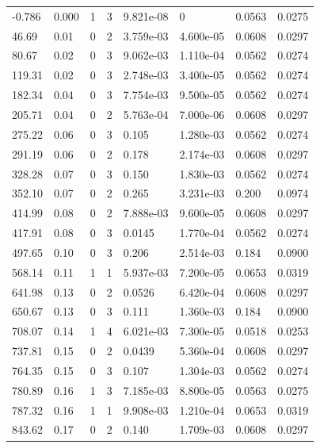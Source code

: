 \documentclass[preview]{standalone}
\begin{document}
{{\begin{tabular}{L{1.2cm}C{1.2cm} C{0.3cm}C{0.5cm} C{1.4cm}C{1.4cm} C{1.4cm}C{1.4cm}}
  -0.786  &  0.000  & 1     &  3 &  9.821e-08  & 0  & 0.0563 &  0.0275   \\ 
  46.69  &  0.01  & 0     &  2 &  3.759e-03  & 4.600e-05  & 0.0608 &  0.0297   \\ 
  80.67  &  0.02  & 0     &  3 &  9.062e-03  & 1.110e-04  & 0.0562 &  0.0274   \\ 
  119.31  &  0.02  & 0     &  3 &  2.748e-03  & 3.400e-05  & 0.0562 &  0.0274   \\ 
  182.34  &  0.04  & 0     &  3 &  7.754e-03  & 9.500e-05  & 0.0562 &  0.0274   \\ 
  205.71  &  0.04  & 0     &  2 &  5.763e-04  & 7.000e-06  & 0.0608 &  0.0297   \\ 
  275.22  &  0.06  & 0     &  3 &  0.105  & 1.280e-03  & 0.0562 &  0.0274   \\ 
  291.19  &  0.06  & 0     &  2 &  0.178  & 2.174e-03  & 0.0608 &  0.0297   \\ 
  328.28  &  0.07  & 0     &  3 &  0.150  & 1.830e-03  & 0.0562 &  0.0274   \\ 
  352.10  &  0.07  & 0     &  2 &  0.265  & 3.231e-03  & 0.200 &  0.0974   \\ 
  414.99  &  0.08  & 0     &  2 &  7.888e-03  & 9.600e-05  & 0.0608 &  0.0297   \\ 
  417.91  &  0.08  & 0     &  3 &  0.0145  & 1.770e-04  & 0.0562 &  0.0274   \\ 
  497.65  &  0.10  & 0     &  3 &  0.206  & 2.514e-03  & 0.184 &  0.0900   \\ 
  568.14  &  0.11  & 1     &  1 &  5.937e-03  & 7.200e-05  & 0.0653 &  0.0319   \\ 
  641.98  &  0.13  & 0     &  2 &  0.0526  & 6.420e-04  & 0.0608 &  0.0297   \\ 
  650.67  &  0.13  & 0     &  3 &  0.111  & 1.360e-03  & 0.184 &  0.0900   \\ 
  708.07  &  0.14  & 1     &  4 &  6.021e-03  & 7.300e-05  & 0.0518 &  0.0253   \\ 
  737.81  &  0.15  & 0     &  2 &  0.0439  & 5.360e-04  & 0.0608 &  0.0297   \\ 
  764.35  &  0.15  & 0     &  3 &  0.107  & 1.304e-03  & 0.0562 &  0.0274   \\ 
  780.89  &  0.16  & 1     &  3 &  7.185e-03  & 8.800e-05  & 0.0563 &  0.0275   \\ 
  787.32  &  0.16  & 1     &  1 &  9.908e-03  & 1.210e-04  & 0.0653 &  0.0319   \\ 
  843.62  &  0.17  & 0     &  2 &  0.140  & 1.709e-03  & 0.0608 &  0.0297   \\ 

\end{tabular}}}
\end{document}
